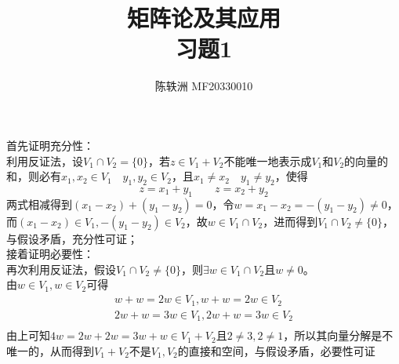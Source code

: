 \documentclass{article}
\title{矩阵论及其应用\\习题1}
\author{陈轶洲 MF20330010}
\begin{document}
	\maketitle
	
\section{}
首先证明充分性：\\
利用反证法，设$V_1\cap V_2= \{0\}$，若$z\in V_1+V_2$不能唯一地表示成$ V_1 $和$V_2$的向量的和，则必有$ x_1,x_2\in V_1 \quad  y_1,y_2\in V_2 $，且$x_1\neq x_2 \quad y_1\neq y_2$，使得
\begin{equation}
	z=x_1+y_1 \qquad z=x_2+y_2
\end{equation}
两式相减得到$ (x_1-x_2)+(y_1-y_2)=0 $，令$ w=x_1-x_2=-(y_1-y_2)\neq 0 $，而$ (x_1-x_2)\in V_1,-(y_1-y_2)\in V_2 $，故$ w\in {V_1\cap V_2} $，进而得到$  {V_1\cap V_2}\neq \{0\}$，与假设矛盾，充分性可证；\\
接着证明必要性：\\
再次利用反证法，假设$  {V_1\cap V_2}\neq \{0\}$，则$ \exists w \in V_1\cap V_2 $且$ w\neq 0 $。\\
由$ w\in V_1,w\in V_2 $可得
\begin{equation}
	\begin{aligned}
w+w=2w\in V_1,w+w=2w\in V_2 \\
2w+w=3w\in V_1,2w+w=3w\in V_2 \\
	\end{aligned}
\end{equation}
由上可知$4w=2w+2w=3w+w\in V_1+V_2$且$2\neq 3,2\neq 1$，所以其向量分解是不唯一的，从而得到$V_1+V_2$不是$ V_1,V_2 $的直接和空间，与假设矛盾，必要性可证
\end{document}
